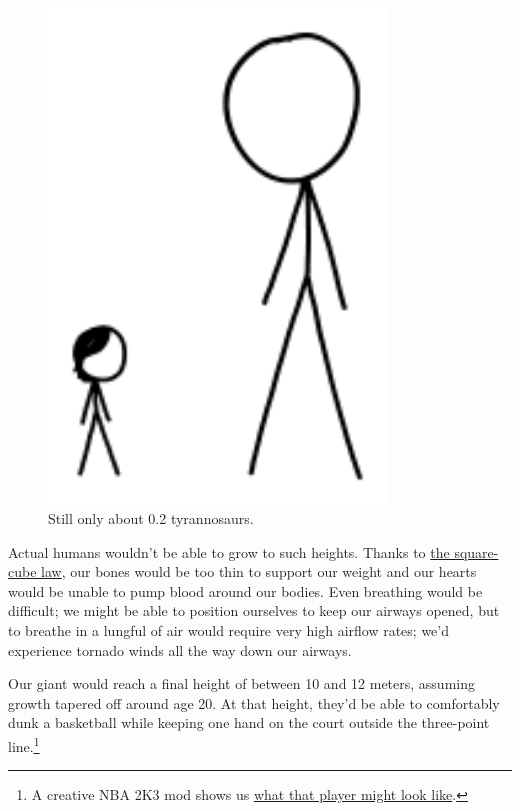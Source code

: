 {\begin{figure}[!htbp]
\centering
\includegraphics[scale=0.5, max width=0.8\textwidth]{imgs/a/77/height_10.png}
\caption{Still only about 0.2 tyrannosaurs.}
\end{figure}

{Actual humans wouldn't be able to grow to such heights. Thanks to \href{https://en.wikipedia.org/wiki/Square-cube\_law}{the square-cube law}, our bones would be too thin to support our weight and our hearts would be unable to pump blood around our bodies. Even breathing would be difficult; we might be able to position ourselves to keep our airways opened, but to breathe in a lungful of air would require very high airflow rates; we'd experience tornado winds all the way down our airways.}

{Our giant would reach a final height of between 10 and 12 meters, assuming growth tapered off around age 20. At that height, they'd be able to comfortably dunk a basketball while keeping one hand on the court outside the three-point line.{\footnote{A creative NBA 2K3 mod shows us \href{http://www.youtube.com/watch?v=vGt10eu4XB8}{what that player might look like}.} } }

}
